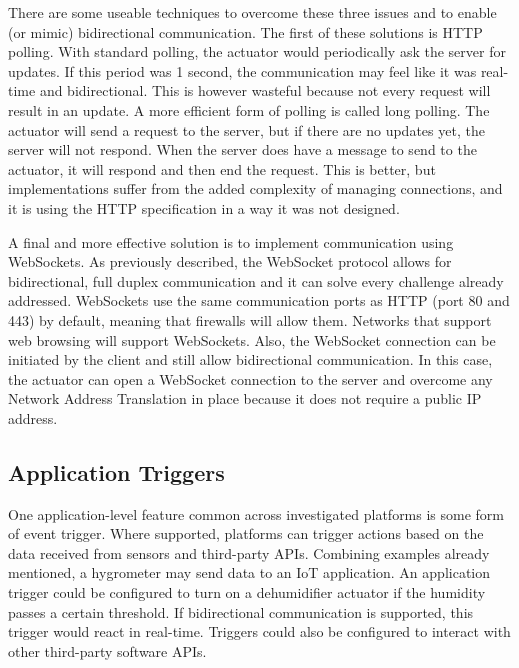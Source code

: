       There are some useable techniques to overcome these three issues and to enable (or mimic) bidirectional communication. The first of these solutions is HTTP polling. With standard polling, the actuator would periodically ask the server for updates. If this period was 1 second, the communication may feel like it was real-time and bidirectional. This is however wasteful because not every request will result in an update. A more efficient form of polling is called long polling. The actuator will send a request to the server, but if there are no updates yet, the server will not respond. When the server does have a message to send to the actuator, it will respond and then end the request. This is better, but implementations suffer from the added complexity of managing connections, and it is using the HTTP specification in a way it was not designed.

      A final and more effective solution is to implement communication using WebSockets. As previously described, the WebSocket protocol allows for bidirectional, full duplex communication and it can solve every challenge already addressed. WebSockets use the same communication ports as HTTP (port 80 and 443) by default, meaning that firewalls will allow them. Networks that support web browsing will support WebSockets. Also, the WebSocket connection can be initiated by the client and still allow bidirectional communication. In this case, the actuator can open a WebSocket connection to the server and overcome any Network Address Translation in place because it does not require a public IP address.

    \subsection{Application Triggers}
      One application-level feature common across investigated platforms is some form of event trigger. Where supported, platforms can trigger actions based on the data received from sensors and third-party APIs. Combining examples already mentioned, a hygrometer may send data to an IoT application. An application trigger could be configured to turn on a dehumidifier actuator if the humidity passes a certain threshold. If bidirectional communication is supported, this trigger would react in real-time. Triggers could also be configured to interact with other third-party software APIs. \citet{IPisDead:2008} \citet{buildingWSN:2010}

